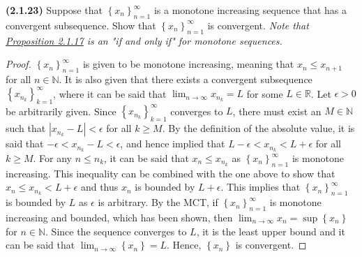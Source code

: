 \documentclass[12pt]{article}
\newcommand{\set}[1]{\left\{ {#1} \right\}}
\newcommand{\limtoinf}[1]{\lim_{ {#1} \to\infty}}
\newcommand{\abs}[1]{\left| {#1} \right|}
\newcommand{\seq}[2][n]{\left\{ {#2} \right\}_{#1=1}^\infty}
\newcommand{\bR}{\mathbb{R}}
\newcommand{\bN}{\mathbb{N}}
\begin{document}
\newpage

\noindent \textbf{(2.1.23)} Suppose that $\set{x_n}_{n=1}^\infty$ is a monotone increasing sequence that has a convergent subsequence. Show that $\set{x_n}_{n=1}^\infty$ is convergent. \textit{Note that \underline{Proposition 2.1.17} is an "if and only if" for monotone sequences.}

\begin{proof}
	$\seq{x_n}$ is given to be monotone increasing, meaning that $x_n\le x_{n+1}$ for all $n\in\bN$. It is also given that there exists a convergent subsequence $\seq[k]{x_{n_k}}$, where it can be said that $\limtoinf{n} x_{n_k}=L$ for some $L\in\bR$. Let $\epsilon>0$ be arbitrarily given. Since $\seq[k]{x_{n_k}}$ converges to $L$, there must exist an $M\in\bN$ such that $\abs{x_{n_k}-L}<\epsilon$ for all $k\ge M$. By the definition of the absolute value, it is said that $-\epsilon < x_{n_k} - L < \epsilon$, and hence implied that $L-\epsilon < x_{n_k} < L+\epsilon$ for all $k\ge M$. For any $n\le n_k$, it can be said that $x_n \le x_{n_k}$ as $\seq{x_n}$ is monotone increasing. This inequality can be combined with the one above to show that $x_n \le x_{n_k}<L+\epsilon$ and thus $x_n$ is bounded by $L+\epsilon$. This implies that $\seq{x_n}$ is bounded by $L$ as $\epsilon$ is arbitrary. By the MCT, if $\seq{x_n}$ is monotone increasing and bounded, which has been shown, then $\limtoinf{n} x_n=\sup\set{x_n}$ for $n\in\bN$. Since the sequence converges to $L$, it is the least upper bound and it can be said that $\limtoinf{n}\set{x_n}=L$. Hence, $\set{x_n}$ is convergent.
\end{proof}
\end{document}
